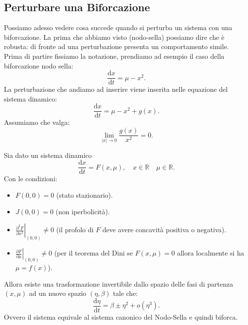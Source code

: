 \subsection{Perturbare una Biforcazione}%
Possiamo adesso vedere cosa succede quando si perturba un sistema con una biforcazione. La prima che abbiamo visto (nodo-sella) possiamo dire che è robusta: di fronte ad una perturbazione presenta un comportamento simile.\\
Prima di partire fissiamo la notazione, prendiamo ad esempio il caso della biforcazione nodo sella: 
\[
    \frac{\text{d} x}{\text{d} t} = \mu-x^2
.\] 
La perturbazione che andiamo ad inserire viene inserita nelle equazione del sistema dinamico:
\[
    \frac{\text{d} x}{\text{d} t} = \mu-x^2+g(x) 
.\] 
Assumiamo che valga:
\[
    \lim_{\left|x\right| \to 0} \frac{g(x)}{x^2} = 0
.\] 
\begin{thm}
    Sia dato un sistema dinamico
    \[
	\frac{\text{d} x}{\text{d} t} = F(x, \mu), \quad  x\in \mathbb{R} \quad  \mu\in \mathbb{R}
    .\] 
    Con le condizioni:
    \begin{itemize}
	\item $F(0,0)= 0$  (stato stazionario).
	\item $J(0, 0) = 0$  (non iperbolicità).
	\item $\left.\frac{\partial ^2F}{\partial x^2} \right|_{(0,0)}\neq 0$ (il profolo di $F$  deve avere concavità positiva o negativa).
	\item $\left.\frac{\partial F}{\partial \mu}\right|_{(0, 0)}\neq 0$ (per il teorema del Dini se $F(x, \mu) = 0$ 
		allora localmente si ha $\mu =f(x)$).
    \end{itemize}
    Allora esiste una trasformazione invertibile dallo spazio delle fasi di partenza $(x, \mu )$  ad un nuovo spazio $(\eta, \beta)$  tale che:
    \[
	\frac{\text{d} \eta}{\text{d} t} = \beta\pm \eta^2 + o(\eta^3) 
    .\] 
    Ovvero il sistema equivale al sistema canonico del Nodo-Sella e quindi biforca.
\end{thm}
\noindent

